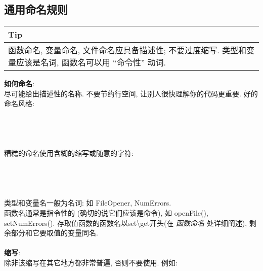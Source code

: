 \documentclass[a4paper,11pt,CJK]{article}
\begin{document}
\begin{CJK}{UTF8}{gbsn}
\subsection{通用命名规则}
\begin{table}[htbp]
\flushleft
\begin{tabular}{p{400pt}}
\toprule
\rowcolor[gray]{.8} Tip \\
\midrule
函数命名, 变量命名, 文件命名应具备描述性; 不要过度缩写. 类型和变量应该是名词, 函数名可以用 ``命令性'' 动词.\\
\bottomrule
\end{tabular}
\end{table}
\noindent
\textbf{如何命名}:\\
\indent 尽可能给出描述性的名称. 不要节约行空间, 让别人很快理解你的代码更重要. 好的命名风格:\\
\\
\\
\\
\\
糟糕的命名使用含糊的缩写或随意的字符:\\
\\
\\
\\
\\
类型和变量名一般为名词: 如 FileOpener, NumErrors.\\
\indent 函数名通常是指令性的 (确切的说它们应该是命令), 如 openFile(), setNumErrors(). 存取值函数的函数名以set\textbackslash{}get开头(在 \emph{函数命名} 处详细阐述), 剩余部分和它要取值的变量同名.\\
\\
\textbf{缩写}:\\
\indent 除非该缩写在其它地方都非常普遍, 否则不要使用. 例如:\\
\\
\fbox{
\begin{minipage}{400pt}

\end{minipage}}
\end{CJK}
\end{document}
